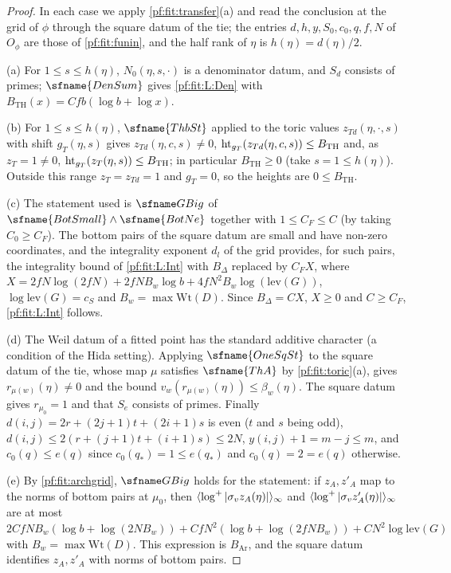 \begin{proof}
In each case we apply \cref{pf:fit:transfer}(a) and read the conclusion at the grid of $\phi$ through the square datum of the
tie; the entries $d,h,y,S_0,c_0,q,f,N$ of $O_\phi$ are those of \cref{pf:fit:funin}, and the half rank of $\eta$ is
$h(\eta)=d(\eta)/2$.

(a) For $1\le s\le h(\eta)$, $N_0(\eta,s,\cdot)$ is a denominator datum, and $S_d$ consists of primes; $\sfname{DenSum}$ gives
\ref{pf:fit:L:Den} with $B_{\mathrm{TH}}(x)=Cfb(\log b+\log x)$.

(b) For $1\le s\le h(\eta)$, $\sfname{ThbSt}$ applied to the toric values $z_{Td}(\eta,\cdot,s)$ with shift $g_T(\eta,s)$ gives
$z_{Td}(\eta,c,s)\ne0$, $\operatorname{ht}_{g_T}(z_{Td}(\eta,c,s))\le B_{\mathrm{TH}}$ and, as $z_T=1\ne0$,
$\operatorname{ht}_{g_T}(z_T(\eta,s))\le B_{\mathrm{TH}}$; in particular $B_{\mathrm{TH}}\ge0$ (take $s=1\le h(\eta)$). Outside this range
$z_T=z_{Td}=1$ and $g_T=0$, so the heights are $0\le B_{\mathrm{TH}}$.

(c) The statement used is $\fitGBig$ of $\sfname{BotSmall}\wedge\sfname{BotNe}$ together with $1\le C_F\le C$ (by taking
$C_0\ge C_F$). The bottom pairs of the square datum are small and have non-zero coordinates, and the integrality exponent
$d_l$ of the grid provides, for such pairs, the integrality bound of \ref{pf:fit:L:Int} with $B_\Delta$ replaced by
$C_FX$, where $X=2fN\log(2fN)+2fNB_w\log b+4fN^2B_w\log(\mathrm{lev}(G))$, $\log\mathrm{lev}(G)=c_S$ and $B_w=\max\mathrm{Wt}(D)$.
Since $B_\Delta=CX$, $X\ge0$ and $C\ge C_F$, \ref{pf:fit:L:Int} follows.

(d) The Weil datum of a fitted point has the standard additive character (a condition of the Hida setting). Applying
$\sfname{OneSqSt}$ to the square datum of the tie, whose map $\mu$ satisfies $\sfname{ThA}$ by \cref{pf:fit:toric}(a), gives
$r_{\mu(w)}(\eta)\ne0$ and the bound $v_w(r_{\mu(w)}(\eta))\le\beta_w(\eta)$. The square datum gives $r_{\mu_0}=1$ and that
$S_e$ consists of primes. Finally $d(i,j)=2r+(2j+1)t+(2i+1)s$ is even ($t$ and $s$ being odd), $d(i,j)\le
2(r+(j+1)t+(i+1)s)\le2N$, $y(i,j)+1=m-j\le m$, and $c_0(q)\le e(q)$ since $c_0(q_*)=1\le e(q_*)$ and $c_0(q)=2=e(q)$ otherwise.

(e) By \cref{pf:fit:archgrid}, $\fitGBig$ holds for the statement: if
$z_A,z'_A$ map to the norms of bottom pairs at $\mu_0$, then $\langle \log^+|\sigma_vz_A(\eta)|\rangle_{\infty}$ and
$\langle \log^+|\sigma_vz'_A(\eta)|\rangle_{\infty}$ are at most
$2CfNB_w(\log b+\log(2NB_w))+CfN^2(\log b+\log(2fNB_w))+CN^2\log\mathrm{lev}(G)$ with $B_w=\max\mathrm{Wt}(D)$. This
expression is $B_{\mathrm{Ar}}$, and the square datum identifies $z_A,z'_A$ with norms of bottom pairs.
\end{proof}


